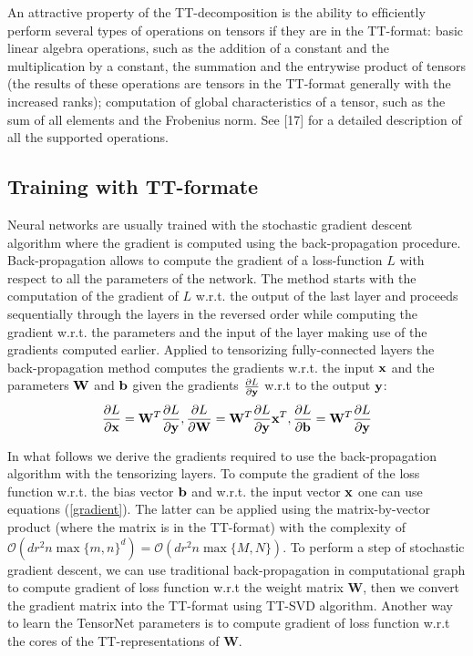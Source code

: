 \documentclass[onecolumn, conference]{IEEEtran}
\begin{document}
An attractive property of the TT-decomposition is the ability to efﬁciently perform several types of operations on tensors if they are in the TT-format: basic linear algebra operations, such as the addition of a constant and the multiplication by a constant, the summation and the entrywise product of tensors (the results of these operations are tensors in the TT-format generally with the increased ranks); computation of global characteristics of a tensor, such as the sum of all elements and the Frobenius norm. 
See [17] for a detailed description of all the supported operations.

\subsection{Training with TT-formate}
Neural networks are usually trained with the stochastic gradient descent algorithm where the gradient is computed using the back-propagation procedure. 
Back-propagation allows to compute the gradient of a loss-function $L$ with respect to all the parameters of the network. 
The method starts with the computation of the gradient of $L$ w.r.t. the output of the last layer and proceeds sequentially through the layers in the reversed order while computing the gradient w.r.t. the parameters and the input of the layer making use of the gradients computed earlier. 
Applied to tensorizing fully-connected layers  the back-propagation method computes the gradients w.r.t. the input $\bf{x}$ and the parameters $\bf{W}$ and $\bf{b}$ given the gradients $\frac{\partial L}{\partial {\bf y}}$ w.r.t to the output ${\bf y}$:
\begin{equation}
    \label{gradient}
    \frac{\partial L}{\partial {\bf x}}={\bf W}^T \frac{\partial L}{\partial {\bf y}}, 
    \frac{\partial L}{\partial {\bf W}}={\bf W}^T \frac{\partial L}{\partial {\bf y}}{\bf x}^T,
    \frac{\partial L}{\partial {\bf b}}={\bf W}^T \frac{\partial L}{\partial {\bf y}}
\end{equation}

In what follows we derive the gradients required to use the back-propagation algorithm with the tensorizing layers. 
To compute the gradient of the loss function w.r.t. the bias vector ${\bf b}$ and w.r.t. the input vector ${\bf x}$ one can use equations (\ref{gradient}). 
The latter can be applied using the matrix-by-vector product (where the matrix is in the TT-format) with the complexity of $\mathcal{O}(dr^2n\max\{m,n\}^d)=\mathcal{O}(dr^2n\max\{M,N\})$.
To perform a step of stochastic gradient descent, we can use traditional back-propagation in computational graph to compute gradient of loss function w.r.t the weight matrix $\mathbf{W}$, then we convert the gradient matrix into the TT-format using TT-SVD algorithm. Another way to learn the TensorNet parameters is to 
compute gradient of loss function w.r.t the cores of the TT-representations of $\mathbf{W}$.
\end{document}

